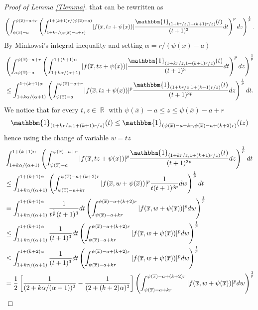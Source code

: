\documentclass[12pt]{article}
\theoremstyle{definition}
\DeclareMathOperator\rr{\mathbb{R}}
\begin{document}
\begin{proof}[Proof of Lemma \ref{Tlemma}]
that can be rewritten as
 \[  \left( \int_{\psi(\overline x) -a}^{\psi(\overline x) -a+r}\left (\int_{1+kr/(\psi(\overline x) -a+r)}^{1+(k+1)r/(\psi(\overline x)-a)} \! |f(\overline x, tz+\psi(x))|\frac{\mathbbm{1}_{(1+kr/z,  1+(k+1)r/z ) }(t)}{(t+1)^3}dt\right)^pdz \right)^{\frac{1}{p}}.\]
 By Minkowsi's integral inequality and setting $\alpha=r/(\psi(\overline x)-a)$
 \begin{align*}
  & \left( \int_{a\psi(\overline x) -a}^{\psi(\overline x) -a+r}\left (\int_{1+k\alpha/(\alpha+1)}^{1+(k+1)\alpha} |f(\overline x, tz+\psi(x))|\frac{\mathbbm{1}_{(1+kr/z,  1+(k+1)r/z ) }(t)}{(t+1)^3}dt\right)^pdz \right)^{\frac{1}{p}} \\
  &\le \int_{1+k\alpha/(\alpha+1)}^{1+(k+1)\alpha} \left ( \int_{\psi(\overline x) -a}^{\psi(\overline x) -a+r}|f(\overline x, tz+\psi(x))|^p\frac{\mathbbm{1}_{(1+kr/z,  1+(k+1)r/z ) }(t)}{(t+1)^{3p}} dz \right) ^{\frac{1}{p}}dt.  
 \end{align*}
 We notice that for every $t,z \in \rr$ with $\psi(\overline x) -a \le z \le \psi(\overline x)-a+r$
 \[ \mathbbm{1}_{(1+kr/z,  1+(k+1)r/z ) }(t) \le \mathbbm{1}_{(\psi(\overline x)-a+kr, \psi(\overline x) - a+(k+2)r)}(tz)   \]
 hence using the change of variable $w=tz$
 \begin{align*}
 &\int_{1+k\alpha/(\alpha+1)}^{1+(k+1)\alpha} \left ( \int_{\psi(\overline x) -a}^{\psi(\overline x) -a+r}|f(\overline x, tz+\psi(x))|^p\frac{\mathbbm{1}_{(1+kr/z,  1+(k+1)r/z ) }(t)}{(t+1)^{3p}} dz \right) ^{\frac{1}{p}}dt \\
&\le \int_{1+k\alpha/(\alpha+1)}^{1+(k+1)\alpha} \left ( \int_{\psi(\overline x)-a+kr}^{\psi(\overline x)-a+(k+2)r}|f(\overline x, w+\psi(\overline x))|^p \frac{1}{t(t+1)^{3p}} dw \right) ^{\frac{1}{p}}dt\\
&=\int_{1+k\alpha/(\alpha+1)}^{1+(k+1)\alpha}\frac{1}{t^{\frac{1}{p}}(t+1)^{3}}dt \left ( \int_{\psi(\overline x)-a+kr}^{\psi(\overline x)-a+(k+2)r}|f(\overline x, w+\psi(\overline x))|^p  dw \right) ^{\frac{1}{p}}\\
&\le \int_{1+k\alpha/(\alpha+1)}^{1+(k+1)\alpha}\frac{1}{(t+1)^{3}}dt \left ( \int_{\psi(\overline x)-a+kr}^{\psi(\overline x)-a+(k+2)r}|f(\overline x, w+\psi(\overline x))|^p  dw \right)^{\frac{1}{p}}\\
&\le \int_{1+k\alpha/(\alpha+1)}^{1+(k+2)\alpha}\frac{1}{(t+1)^{3}}dt \left ( \int_{\psi(\overline x)-a+kr}^{\psi(\overline x)-a+(k+2)r}|f(\overline x, w+\psi(\overline x))|^p  dw \right)^{\frac{1}{p}}\\
&= \frac{1}{2}\left[\frac{1}{(2+k\alpha/(\alpha+1))^2} -\frac{1}{(2+(k+2)\alpha)^2}\right] \left ( \int_{\psi(\overline x)-a+kr}^{\psi(\overline x)-a+(k+2)r}|f(\overline x, w+\psi(\overline x))|^p  dw \right) ^{\frac{1}{p}}\\

\end{align*}
\end{proof}
\end{document}
